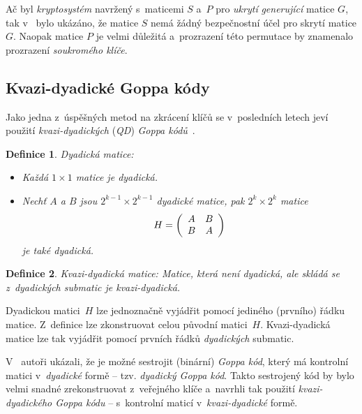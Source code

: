 \documentclass[thesis=M,czech,hidelinks]{FITthesis}[2012/06/26]
\newcommand{\0}{{\textcolor[gray]{0.75}{0}}}
\newtheorem{definice}{Definice}
\begin{document}
Ač byl \emph{kryptosystém} navržený s~maticemi $S$ a~$P$ pro \emph{ukrytí}
\emph{generující} matice $G$, tak v~\cite{Engelbert} bylo ukázáno, že matice $S$
nemá žádný bezpečnostní účel pro skrytí matice $G$. Naopak matice $P$ je velmi
důležitá a~prozrazení této permutace by znamenalo prozrazení \emph{soukromého
klíče}.


\subsection{Kvazi-dyadické Goppa kódy}\label{kap_kvazi}

Jako jedna z~úspěšných metod na zkrácení klíčů se v~posledních letech jeví
použití \emph{kvazi-dyadických} (\emph{QD}) \emph{Goppa kódů}~\cite{Misoczki1}.

\begin{definice}{Dyadická matice:}
    \begin{itemize}
        \item Každá $1\times1$ matice je \emph{dyadická}.

        \item Nechť $A$ a $B$ jsou $2^{k-1}\times2^{k-1}$ \emph{dyadické}
            matice, pak
            $2^k\times2^k$ matice
            $$
                H = \left(\begin{array}{c c}
                    A & B\\
                    B & A
                \end{array}\right)
            $$
            je také \emph{dyadická}.

    \end{itemize}
\end{definice}


\begin{definice}{Kvazi-dyadická matice:}
    Matice, která není \emph{dyadická}, ale skládá se z~\emph{dyadických}
    submatic je \emph{kvazi-dyadická}.
\end{definice}

Dyadickou matici~$H$ lze jednoznačně vyjádřit pomocí jediného (prvního) řádku
matice. Z~definice lze zkonstruovat celou původní matici~$H$. Kvazi-dyadická
matice lze tak vyjádřit pomocí prvních řádků \emph{dyadických} submatic.


V~\cite{Misoczki1} autoři ukázali, že je možné sestrojit (binární) \emph{Goppa
kód}, který má kontrolní matici v~\emph{dyadické} formě -- tzv. \emph{dyadický
Goppa kód}. Takto sestrojený kód by bylo velmi snadné zrekonstruovat z~veřejného
klíče a~navrhli tak použití \emph{kvazi-dyadického Goppa kódu} -- s~kontrolní
maticí v~\emph{kvazi-dyadické} formě.
\end{document}
